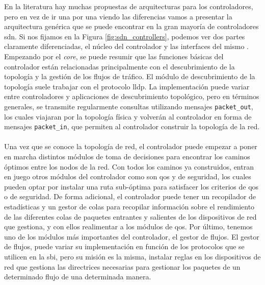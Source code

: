 En la literatura hay muchas propuestas de arquitecturas para los controladores, pero en vez de ir una por una viendo las diferencias vamos a presentar la arquitectura genérica que se puede encontrar en la gran mayoría de controladores \gls{sdn}. Si nos fijamos en la Figura \ref{fig:sdn_controllers}, podemos ver dos partes claramente diferenciadas, el núcleo del controlador y las interfaces del mismo \cite{zhu2020sdn}. Empezando por el \textit{core}, se puede resumir que las funciones básicas del controlador están relacionadas principalmente con el descubrimiento de la topología y la gestión de los flujos de tráfico. El módulo de descubrimiento de la topología suele trabajar con el protocolo \gls{lldp}. La implementación puede variar entre controladores y aplicaciones de descubrimiento topológico, pero en términos generales, se transmite regularmente consultas utilizando mensajes \texttt{packet\_out}, los cuales viajaran por la topología física y volverán al controlador en forma de mensajes \texttt{packet\_in}, que permiten al controlador construir la topología de la red.\\
\\
Una vez que se conoce la topología de red, el controlador puede empezar a poner en marcha distintos módulos de toma de decisiones para encontrar los caminos óptimos entre los nodos de la red. Con todos los caminos ya construidos, entran en juego otros módulos del controlador como son \gls{qos} y de seguridad, los cuales pueden optar por instalar una ruta sub-óptima para satisfacer los criterios de \gls{qos} o de seguridad. De forma adicional, el controlador puede tener un recopilador de estadísticas y un gestor de colas para recopilar información sobre el rendimiento de las diferentes colas de paquetes entrantes y salientes de los dispositivos de red que gestiona, y con ellos realimentar a los módulos de \gls{qos}. Por último, tenemos uno de los módulos más importantes del controlador, el gestor de flujos. El gestor de flujos, puede variar su implementación en función de los protocolos que se utilicen en la \gls{sbi}, pero su misión es la misma, instalar reglas en los dispositivos de red que gestiona las directrices necesarias para gestionar los paquetes de un determinado flujo de una determinada manera. \\
\\
